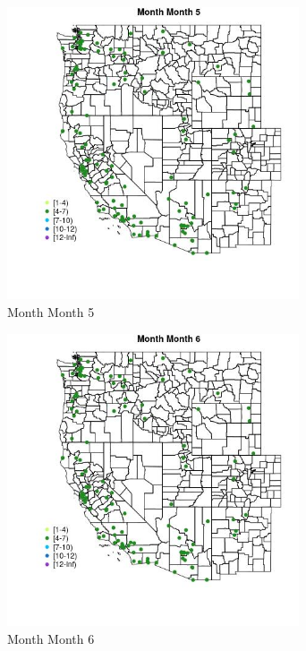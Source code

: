 \begin{figure} 
\centering  
\includegraphics[width=0.77\textwidth]{Code_Outputs/Report_ML_input_PM25_Step4_part_e_de_duplicated_aves_MapObsMo5Month.jpg} 
\caption{\label{fig:Report_ML_input_PM25_Step4_part_e_de_duplicated_avesMapObsMo5Month}Month Month 5} 
\end{figure} 
 

\begin{figure} 
\centering  
\includegraphics[width=0.77\textwidth]{Code_Outputs/Report_ML_input_PM25_Step4_part_e_de_duplicated_aves_MapObsMo6Month.jpg} 
\caption{\label{fig:Report_ML_input_PM25_Step4_part_e_de_duplicated_avesMapObsMo6Month}Month Month 6} 
\end{figure} 
 

